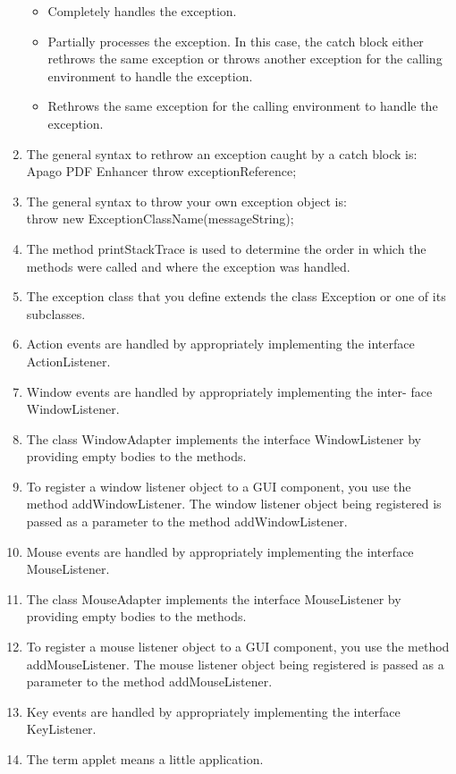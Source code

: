 \documentclass[12pt,a4paper,final,twoside,onecolumn,titlepage]{book}
\begin{document}
\begin{enumerate}
\begin{itemize}
\item Completely handles the exception.
\item Partially processes the exception. In this case, the catch block either rethrows the same exception or throws another exception for the calling environment to handle the exception.
\item Rethrows the same exception for the calling environment to handle the exception.
\end{itemize}
\item The general syntax to rethrow an exception caught by a catch block is: Apago PDF Enhancer throw exceptionReference;
\item The general syntax to throw your own exception object is: \\
throw new ExceptionClassName(messageString);
\item The method printStackTrace is used to determine the order in which the methods were called and where the exception was handled.
\item The exception class that you define extends the class Exception or one of its subclasses.
\item Action events are handled by appropriately implementing the interface ActionListener.
\item Window events are handled by appropriately implementing the inter- face WindowListener.
\item The class WindowAdapter implements the interface WindowListener by providing empty bodies to the methods.
\item To register a window listener object to a GUI component, you use the method addWindowListener. The window listener object being registered is passed as a parameter to the method addWindowListener.
\item Mouse events are handled by appropriately implementing the interface MouseListener.
\item The class MouseAdapter implements the interface MouseListener by providing empty bodies to the methods.
\item To register a mouse listener object to a GUI component, you use the method addMouseListener. The mouse listener object being registered is passed as a parameter to the method addMouseListener.
\item Key events are handled by appropriately implementing the interface KeyListener.
\item The term applet means a little application.

\end{enumerate}
\end{document}
